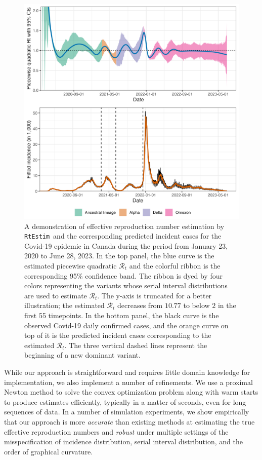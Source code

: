 \documentclass[10pt,letterpaper]{article}
\def\RtEstim{\texttt{RtEstim}}
\def\calR{\mathcal{R}}
\begin{document}
\begin{figure}[!ht]
  \centering
  \includegraphics[width=.9\textwidth]{fig/intro-fig-new.png}
  \caption{A demonstration of effective reproduction number estimation 
  by \RtEstim\ and the corresponding predicted incident cases for the Covid-19 
  epidemic in Canada during the period from January 23, 2020 to June 28, 2023. 
  In the top panel, the blue curve is the estimated piecewise quadratic $\calR_t$ 
  and the colorful ribbon is the corresponding 95\% confidence band. 
  The ribbon is dyed by four colors representing the variants whose serial interval 
  distributions are used to estimate $\calR_t$. The y-axis is truncated for 
  a better illustration; the estimated $\calR_t$ decreases from $10.77$ to below $2$
  in the first 55 timepoints. In the bottom panel, the black curve is the observed Covid-19 
  daily confirmed cases, and the orange curve on top of it is the predicted incident cases
  corresponding to the estimated $\calR_t$. The three vertical dashed lines 
  represent the beginning of a new dominant variant.}
  \label{fig:intro-fig}
\end{figure}

While our approach is straightforward and requires little domain knowledge for
implementation, we also implement a number of refinements. 
We use a proximal Newton method to solve the convex optimization problem along
with warm starts to produce estimates efficiently, typically in a matter of 
seconds, even for long sequences of data. In a number of simulation experiments, 
we show empirically that our approach is more \textit{accurate} than existing methods at 
estimating the true effective reproduction numbers and \textit{robust} under multiple 
settings of the misspecification of incidence distribution, serial interval 
distribution, and the order of graphical curvature. 
\end{document}
